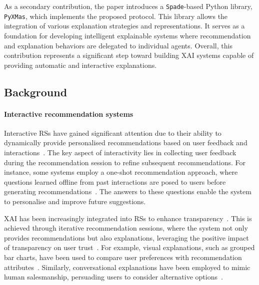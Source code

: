 As a secondary contribution, the paper introduces a \texttt{Spade}-based Python library, \texttt{PyXMas}, which implements the proposed protocol.
%
This library allows the integration of various explanation strategies and representations.
%
It serves as a foundation for developing intelligent explainable systems where recommendation and explanation behaviors are delegated to individual agents.
%
Overall, this contribution represents a significant step toward building \gls{XAI} systems capable of providing automatic and interactive explanations.


\subsection{Background}\label{subsec:background-general-purpose-protocol-for-multi-agent-based-explanations}
%
\paragraph{Interactive recommendation systems}
%
Interactive \glspl{RS} have gained significant attention due to their ability to dynamically provide personalised recommendations based on user feedback and interactions~\cite{citation_needed}.
%
The key aspect of interactivity lies in collecting user feedback during the recommendation session to refine subsequent recommendations.
%
For instance, some systems employ a one-shot recommendation approach, where questions learned offline from past interactions are posed to users before generating recommendations~\cite{citation_needed}.
%
The answers to these questions enable the system to personalise and improve future suggestions.

\Gls{XAI} has been increasingly integrated into \glspl{RS} to enhance transparency~\cite{citation_needed}.
%
This is achieved through iterative recommendation sessions, where the system not only provides recommendations but also explanations, leveraging the positive impact of transparency on user trust~\cite{citation_needed}.
%
For example, visual explanations, such as grouped bar charts, have been used to compare user preferences with recommendation attributes~\cite{citation_needed}.
%
Similarly, conversational explanations have been employed to mimic human salesmanship, persuading users to consider alternative options~\cite{citation_needed}.


